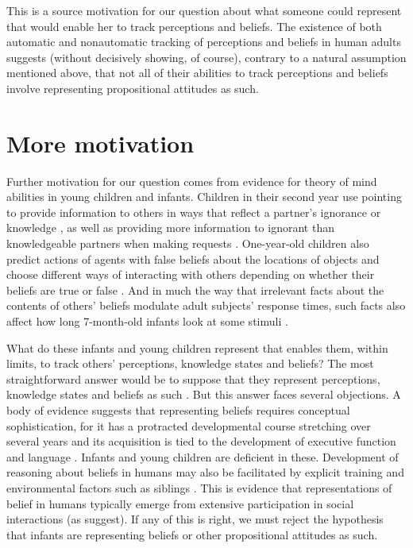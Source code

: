 \documentclass[12pt,\papersize]{extarticle}
\begin{document}
This is a source motivation for our question about what someone could represent that would enable her to track perceptions and beliefs.
The existence of both automatic and nonautomatic tracking of perceptions and beliefs in human adults 
suggests (without decisively showing, of course), 
contrary to a natural assumption mentioned above,
that not all of their abilities to track perceptions and beliefs involve representing propositional attitudes as such.

\section{More motivation}
\label{sec:more_motivation} 
Further motivation for our question comes from evidence for theory of mind abilities in young children and infants.
Children in their second year use pointing to provide information to others \citep[]{en_1093} in ways that reflect a partner’s ignorance or knowledge \citep[]{en_1699}, as well as providing more information to ignorant than knowledgeable partners when making requests \citep[]{en_1140}.  One-year-old children also predict actions of agents with false beliefs about the locations of objects \citep[]{en_1092, en_1208} and choose different ways of interacting with others depending on whether their beliefs are true or false \citep[]{en_1783,Knudsen:2011fk,southgate:2010fb}.  And in much the way that irrelevant facts about the contents of others’ beliefs modulate adult subjects’ response times, such facts also affect how long 7-month-old infants look at some stimuli \citep[]{kovacs_social_2010}.

What do these infants and young children represent that enables them, within limits, to track others’ perceptions, knowledge states and beliefs?   
The most straightforward answer would be to suppose that they represent perceptions, knowledge states and beliefs as such \citep[e.g.][]{en_1138, en_1691}.  
But this answer faces several objections.  A body of evidence  suggests that representing beliefs requires conceptual sophistication, for it has a protracted developmental course stretching over several years \citep[]{en_87, en_89} and its acquisition is tied to the development of executive function \citep[]{en_410, en_1130} and language \citep[]{en_1209}.  Infants and young children are deficient in these.  
Development of reasoning about beliefs in humans may also be facilitated by explicit training \citep[]{en_85} and environmental factors such as siblings \citep[]{en_507, en_1299}.  
This is evidence that representations of belief in humans typically emerge from extensive participation in social interactions (as \citealp{en_1300} suggest).  
If any of this is right, we must reject the hypothesis that infants are representing beliefs or other propositional attitudes as such.
\end{document}
